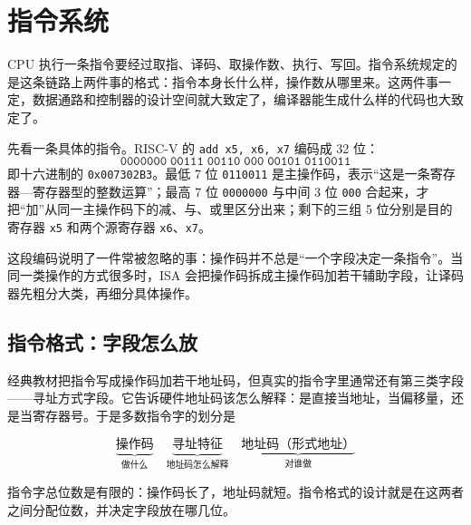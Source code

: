 \section{指令系统}

CPU 执行一条指令要经过取指、译码、取操作数、执行、写回。指令系统规定的是这条链路上两件事的格式：指令本身长什么样，操作数从哪里来。这两件事一定，数据通路和控制器的设计空间就大致定了，编译器能生成什么样的代码也大致定了。

先看一条具体的指令。RISC-V 的 \texttt{add x5, x6, x7} 编码成 32 位：
\[
\texttt{0000000}\;\texttt{00111}\;\texttt{00110}\;\texttt{000}\;\texttt{00101}\;\texttt{0110011}
\]
即十六进制的 \texttt{0x007302B3}。最低 7 位 \texttt{0110011} 是主操作码，表示“这是一条寄存器—寄存器型的整数运算”；最高 7 位 \texttt{0000000} 与中间 3 位 \texttt{000} 合起来，才把“加”从同一主操作码下的减、与、或里区分出来；剩下的三组 5 位分别是目的寄存器 \texttt{x5} 和两个源寄存器 \texttt{x6}、\texttt{x7}。

这段编码说明了一件常被忽略的事：操作码并不总是“一个字段决定一条指令”。当同一类操作的方式很多时，ISA 会把操作码拆成主操作码加若干辅助字段，让译码器先粗分大类，再细分具体操作。

\subsection{指令格式：字段怎么放}

经典教材把指令写成操作码加若干地址码，但真实的指令字里通常还有第三类字段——寻址方式字段。它告诉硬件地址码该怎么解释：是直接当地址，当偏移量，还是当寄存器号。于是多数指令字的划分是

\[
\underbrace{\text{操作码}}_{\text{做什么}}\quad
\underbrace{\text{寻址特征}}_{\text{地址码怎么解释}}\quad
\underbrace{\text{地址码（形式地址）}}_{\text{对谁做}}
\]

指令字总位数是有限的：操作码长了，地址码就短。指令格式的设计就是在这两者之间分配位数，并决定字段放在哪几位。

